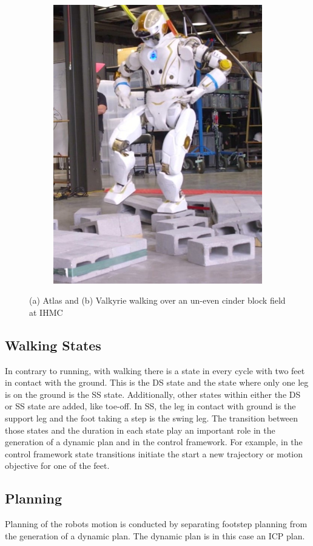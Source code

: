 \begin{figure}[h]
\begin{subfigure}{0.45\textwidth}
  \includegraphics[width=.8\linewidth]{STYLESTUFF/Valkyrie.jpeg}
  \caption{}
   \label{fig:valkyrie}
  \end{subfigure}
  \caption{(a) Atlas \cite{oldatlas} and (b) Valkyrie \cite{valkyrie} walking over an un-even cinder block field at IHMC }
  \label{fig:robots}
\end{figure}
\subsection{Walking States}
In contrary to running, with walking there is a state in every cycle with two feet in contact with the ground. This is the \ac{DS} state and the state where only one leg is on the ground is the \ac{SS} state. Additionally, other states within either the \ac{DS} or \ac{SS} state are added, like toe-off. In \ac{SS}, the leg in contact with ground is the support leg and the foot taking a step is the swing leg. The transition between those states and the duration in each state play an important role in the generation of a dynamic plan and in the control framework. For example, in the control framework state transitions initiate the start a new trajectory or motion objective for one of the feet.
\subsection{Planning}
Planning of the robots motion is conducted by separating footstep planning from the generation of a dynamic plan. The dynamic plan is in this case an \ac{ICP} plan.
